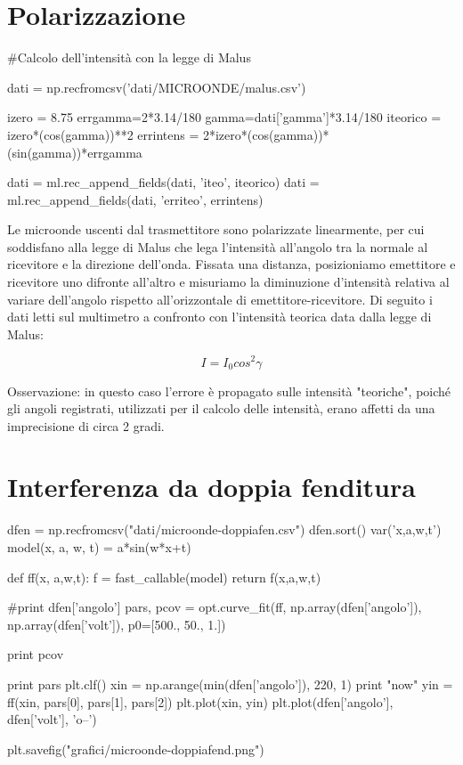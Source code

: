 
\section{Polarizzazione}

\begin{sagesilent}
#Calcolo dell'intensità con la legge di Malus

dati = np.recfromcsv('dati/MICROONDE/malus.csv')

izero = 8.75
errgamma=2*3.14/180
gamma=dati['gamma']*3.14/180
iteorico = izero*(cos(gamma))**2
errintens = 2*izero*(cos(gamma))*(sin(gamma))*errgamma

dati = ml.rec_append_fields(dati, 'iteo', iteorico)
dati = ml.rec_append_fields(dati, 'erriteo', errintens)

\end{sagesilent}


Le microonde uscenti dal trasmettitore sono polarizzate linearmente, per cui soddisfano alla legge di Malus che lega l'intensità all'angolo tra la normale al ricevitore e la direzione dell'onda. Fissata una distanza, posizioniamo emettitore e ricevitore uno difronte all'altro e misuriamo la diminuzione d'intensità relativa al variare dell'angolo rispetto all'orizzontale di emettitore-ricevitore. Di seguito i dati letti sul multimetro a confronto con l'intensità teorica data dalla legge di Malus:

\begin{equation}
I = I_{0} cos^2 \gamma
\end{equation}

\begin{center}
\end{center}

Osservazione: in questo caso l'errore è propagato sulle intensità "teoriche", poiché gli angoli registrati, utilizzati per il calcolo delle intensità, erano affetti da una imprecisione di circa 2 gradi.


\section{Interferenza da doppia fenditura}
\begin{sagesilent}
dfen = np.recfromcsv("dati/microonde-doppiafen.csv")
dfen.sort()
var('x,a,w,t')
model(x, a, w, t) = a*sin(w*x+t)

def ff(x, a,w,t):
  f = fast_callable(model)
  return f(x,a,w,t)

#print dfen['angolo']
pars, pcov = opt.curve_fit(ff, np.array(dfen['angolo']), np.array(dfen['volt']), p0=[500., 50., 1.])

print pcov

print pars
plt.clf()
xin = np.arange(min(dfen['angolo']), 220, 1)
print "now"
yin = ff(xin, pars[0], pars[1], pars[2])
plt.plot(xin, yin)
plt.plot(dfen['angolo'], dfen['volt'], 'o--')

plt.savefig("grafici/microonde-doppiafend.png")
\end{sagesilent}


